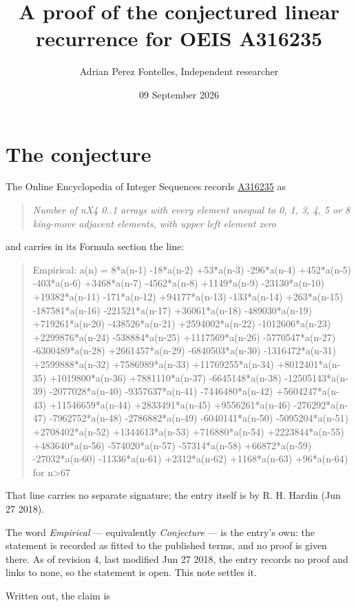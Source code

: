 \documentclass[11pt]{article}
\title{A proof of the conjectured linear recurrence for OEIS A316235}
\author{Adrian Perez Fontelles, Independent researcher}
\date{09 September 2026}
\theoremstyle{definition}
\begin{document}
\maketitle
\section{The conjecture}

The Online Encyclopedia of Integer Sequences records \href{https://oeis.org/A316235}{A316235} as

\begin{quote}\itshape Number of nX4 0..1 arrays with every element unequal to 0, 1, 3, 4, 5 or 8 king-move adjacent elements, with upper left element zero\end{quote}

and carries in its Formula section the line:

\begin{quote}\ttfamily Empirical: a(n) = 8*a(n-1) -18*a(n-2) +53*a(n-3) -296*a(n-4) +452*a(n-5) -403*a(n-6) +3468*a(n-7) -4562*a(n-8) +1149*a(n-9) -23130*a(n-10) +19382*a(n-11) -171*a(n-12) +94177*a(n-13) -133*a(n-14) +263*a(n-15) -187581*a(n-16) -221521*a(n-17) +36061*a(n-18) -489030*a(n-19) +719261*a(n-20) -438526*a(n-21) +2594002*a(n-22) -1012606*a(n-23) +2299876*a(n-24) -538884*a(n-25) +1117569*a(n-26) -5770547*a(n-27) -6300489*a(n-28) +2661457*a(n-29) -6840503*a(n-30) -1316472*a(n-31) +2599888*a(n-32) +7586989*a(n-33) +11769255*a(n-34) +8012401*a(n-35) +1019800*a(n-36) +7881110*a(n-37) -6645148*a(n-38) -12505143*a(n-39) -2077028*a(n-40) -9357637*a(n-41) -7446480*a(n-42) +5604247*a(n-43) +11546659*a(n-44) +2833491*a(n-45) +9556261*a(n-46) -276292*a(n-47) -7962752*a(n-48) -2786882*a(n-49) -6040141*a(n-50) -5095204*a(n-51) +2708402*a(n-52) +1344613*a(n-53) +716880*a(n-54) +2223844*a(n-55) +483640*a(n-56) -574020*a(n-57) -57314*a(n-58) +66872*a(n-59) -27032*a(n-60) -11336*a(n-61) +2312*a(n-62) +1168*a(n-63) +96*a(n-64) for n>67\end{quote}

That line carries no separate signature; the entry itself is by R. H. Hardin (Jun 27 2018).

The word {\itshape Empirical} --- equivalently {\itshape Conjecture} --- is the entry's own: the statement is recorded as fitted to the published terms, and no proof is given there. As of revision 4, last modified Jun 27 2018, the entry records no proof and links to none, so the statement is open. This note settles it.

Written out, the claim is
\end{document}
